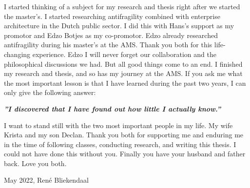 {	I started thinking of a subject for my research and thesis right after we started the master's. I started researching antifragility combined with enterprise architecture in the Dutch public sector. I did this with Hans's support as my promotor and Edzo Botjes as my co-promotor. Edzo already researched antifragility during his master's at the AMS. Thank you both for this life-changing experience. Edzo I will never forget our collaboration and the philosophical discussions we had. But all good things come to an end. I finished my research and thesis, and so has my journey at the AMS. If you ask me what the most important lesson is that I have learned during the past two years, I can only give the following answer:
	\begin{center}
	\textbf{\textit{''I discovered that I have found out how little I actually know.''}}
	\end{center}
	I want to stand still with the two most important people in my life. My wife Krista and my son Declan. Thank you both for supporting me and enduring me in the time of following classes, conducting research, and writing this thesis. I could not have done this without you. Finally you have your husband and father back. Love you both.
	
	\vspace{\baselineskip}
	 May 2022, René Bliekendaal

}%
